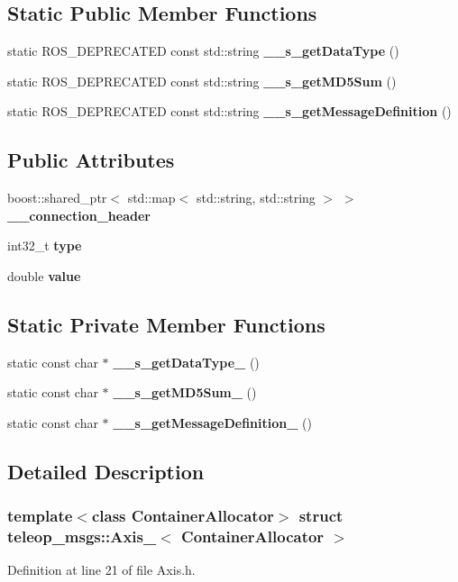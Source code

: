 \subsection*{Static Public Member Functions}
\begin{DoxyCompactItemize}
\item 
static ROS\_\-DEPRECATED const std::string {\bf \_\-\_\-s\_\-getDataType} ()
\item 
static ROS\_\-DEPRECATED const std::string {\bf \_\-\_\-s\_\-getMD5Sum} ()
\item 
static ROS\_\-DEPRECATED const std::string {\bf \_\-\_\-s\_\-getMessageDefinition} ()
\end{DoxyCompactItemize}
\subsection*{Public Attributes}
\begin{DoxyCompactItemize}
\item 
boost::shared\_\-ptr$<$ std::map$<$ std::string, std::string $>$ $>$ {\bf \_\-\_\-connection\_\-header}
\item 
int32\_\-t {\bf type}
\item 
double {\bf value}
\end{DoxyCompactItemize}
\subsection*{Static Private Member Functions}
\begin{DoxyCompactItemize}
\item 
static const char $\ast$ {\bf \_\-\_\-s\_\-getDataType\_\-} ()
\item 
static const char $\ast$ {\bf \_\-\_\-s\_\-getMD5Sum\_\-} ()
\item 
static const char $\ast$ {\bf \_\-\_\-s\_\-getMessageDefinition\_\-} ()
\end{DoxyCompactItemize}


\subsection{Detailed Description}
\subsubsection*{template$<$class ContainerAllocator$>$ struct teleop\_\-msgs::Axis\_\-$<$ ContainerAllocator $>$}



Definition at line 21 of file Axis.h.



